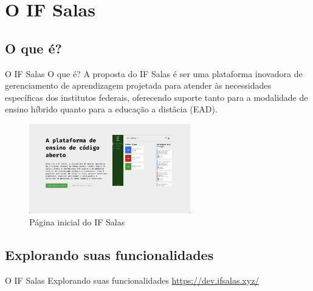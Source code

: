 \AtBeginSection[]{
	\begin{frame}
		\frametitle{}
		\tableofcontents[currentsection]
	\end{frame}
}

\section{O IF Salas}

\subsection{O que é?}
\begin{frame}{O IF Salas}
	{O que é?}
	A proposta do IF Salas é ser uma plataforma inovadora de gerenciamento de aprendizagem projetada 
	para atender às necessidades específicas dos institutos federais, oferecendo suporte tanto para a 
	modalidade de ensino híbrido quanto para a educação a distâcia (EAD).
	\begin{center}
		\begin{figure}
			\includegraphics[width=7cm]{images/if-salas-pagina.png}
			\caption{Página inicial do IF Salas}
		\end{figure}
	\end{center}
\end{frame}

\subsection{Explorando suas funcionalidades}
\begin{frame}{O IF Salas}
	{Explorando suas funcionalidades}
	\centering
	\href{https://dev.ifsalas.xyz/}{https://dev.ifsalas.xyz/}
\end{frame}